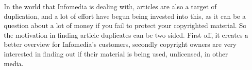 In the world that Infomedia is dealing with, articles are also a target of duplication, and a lot of effort have begun being invested into this, as it can be a question about a lot of money if you fail to protect your copyrighted material. So the motivation in finding article duplicates can be two sided. First off, it creates a better overview for Infomedia's customers, secondly copyright owners are very interested in finding out if their material is being used, unlicensed, in other media.

